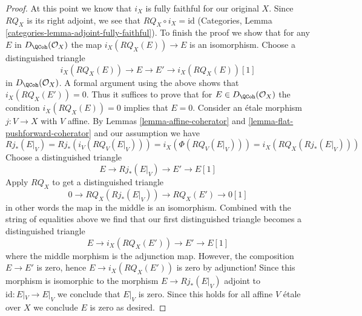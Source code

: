 \begin{proof}
\medskip\noindent
At this point we know that $i_X$ is fully faithful for our original $X$.
Since $RQ_X$ is its right adjoint, we see that
$RQ_X \circ i_X = \text{id}$ (Categories, Lemma
\ref{categories-lemma-adjoint-fully-faithful}).
To finish the proof we show that for any
$E$ in $D_\QCoh(\mathcal{O}_X)$ the map
$i_X(RQ_X(E)) \to E$ is an isomorphism. Choose a distinguished triangle
$$
i_X(RQ_X(E)) \to E \to E' \to i_X(RQ_X(E))[1]
$$
in $D_\QCoh(\mathcal{O}_X)$. A formal argument using the
above shows that $i_X(RQ_X(E')) = 0$. Thus it suffices to prove that
for $E \in D_\QCoh(\mathcal{O}_X)$ the condition
$i_X(RQ_X(E)) = 0$ implies that $E = 0$. Consider an \'etale morphism
$j : V \to X$ with $V$ affine. By
Lemmas \ref{lemma-affine-coherator} and
\ref{lemma-flat-pushforward-coherator}
and our assumption we have
$$
Rj_*(E|_V) = Rj_*(i_V(RQ_V(E|_V))) = i_X(\Phi(RQ_V(E|_V))) =
i_X(RQ_X(Rj_*(E|_V)))
$$
Choose a distinguished triangle
$$
E \to Rj_*(E|_V) \to E' \to E[1]
$$
Apply $RQ_X$ to get a distinguished triangle
$$
0 \to RQ_X(Rj_*(E|_V)) \to RQ_X(E') \to 0[1]
$$
in other words the map in the middle is an isomorphism.
Combined with the string of equalities above we find
that our first distinguished triangle becomes a distinguished triangle
$$
E \to i_X(RQ_X(E')) \to E' \to E[1]
$$
where the middle morphism is the adjunction map. However, the composition
$E \to E'$ is zero, hence $E \to i_X(RQ_X(E'))$ is zero by adjunction!
Since this morphism is isomorphic to the morphism
$E \to Rj_*(E|_V)$ adjoint to $\text{id} : E|_V \to E|_V$ we
conclude that $E|_V$ is zero. Since this holds for all
affine $V$ \'etale over $X$ we conclude $E$ is zero as desired.
\end{proof}